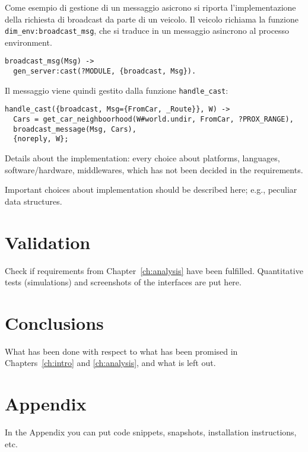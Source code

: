 \documentclass{memoir}
\begin{document}
Come esempio di gestione di un messaggio asicrono si riporta l'implementazione
della richiesta di broadcast da parte di un veicolo. Il veicolo richiama la
funzione \texttt{dim\_env:broadcast\_msg}, che si traduce in un messaggio
asincrono al processo environment.
\begin{verbatim}
broadcast_msg(Msg) ->
  gen_server:cast(?MODULE, {broadcast, Msg}).
\end{verbatim}
Il messaggio viene quindi gestito dalla funzione \texttt{handle\_cast}:
\begin{verbatim}
handle_cast({broadcast, Msg={FromCar, _Route}}, W) ->
  Cars = get_car_neighboorhood(W#world.undir, FromCar, ?PROX_RANGE),
  broadcast_message(Msg, Cars),
  {noreply, W};
\end{verbatim}

\newpage


Details about the implementation: every choice about platforms, languages, software/hardware, middlewares, which has not been decided in the requirements.


Important choices about implementation should be described here; e.g., peculiar data structures.


\chapter{Validation}

Check if requirements from Chapter~\ref{ch:analysis} have been fulfilled.
Quantitative tests (simulations) and screenshots of the interfaces are put here.


\chapter{Conclusions}

What has been done with respect to what has been promised in Chapters~\ref{ch:intro} and \ref{ch:analysis}, and what is left out.

\appendix

\chapter{Appendix}

In the Appendix you can put code snippets, snapshots, installation instructions, etc.
\end{document}
